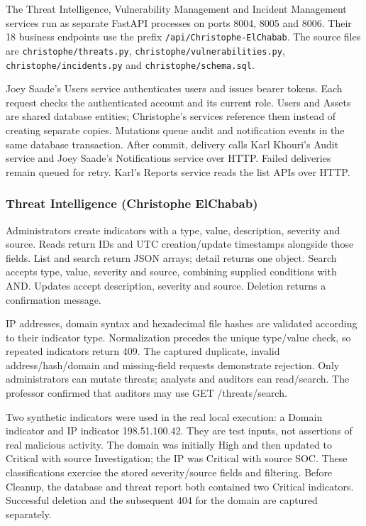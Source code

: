 The Threat Intelligence, Vulnerability Management and Incident Management services run as separate FastAPI processes on ports 8004, 8005 and 8006. Their 18 business endpoints use the prefix \texttt{/api/Christophe-ElChabab}. The source files are \texttt{christophe/threats.py}, \texttt{christophe/vulnerabilities.py}, \texttt{christophe/incidents.py} and \texttt{christophe/schema.sql}.

Joey Saade's Users service authenticates users and issues bearer tokens. Each request checks the authenticated account and its current role. Users and Assets are shared database entities; Christophe's services reference them instead of creating separate copies. Mutations queue audit and notification events in the same database transaction. After commit, delivery calls Karl Khouri's Audit service and Joey Saade's Notifications service over HTTP. Failed deliveries remain queued for retry. Karl's Reports service reads the list APIs over HTTP.

\subsubsection{Threat Intelligence (Christophe ElChabab)}

Administrators create indicators with a type, value, description, severity and source. Reads return IDs and UTC creation/update timestamps alongside those fields. List and search return JSON arrays; detail returns one object. Search accepts type, value, severity and source, combining supplied conditions with AND. Updates accept description, severity and source. Deletion returns a confirmation message.

IP addresses, domain syntax and hexadecimal file hashes are validated according to their indicator type. Normalization precedes the unique type/value check, so repeated indicators return 409. The captured duplicate, invalid address/hash/domain and missing-field requests demonstrate rejection. Only administrators can mutate threats; analysts and auditors can read/search. The professor confirmed that auditors may use GET /threats/search.

Two synthetic indicators were used in the real local execution: a Domain indicator and IP indicator 198.51.100.42. They are test inputs, not assertions of real malicious activity. The domain was initially High and then updated to Critical with source Investigation; the IP was Critical with source SOC. These classifications exercise the stored severity/source fields and filtering. Before Cleanup, the database and threat report both contained two Critical indicators. Successful deletion and the subsequent 404 for the domain are captured separately.

